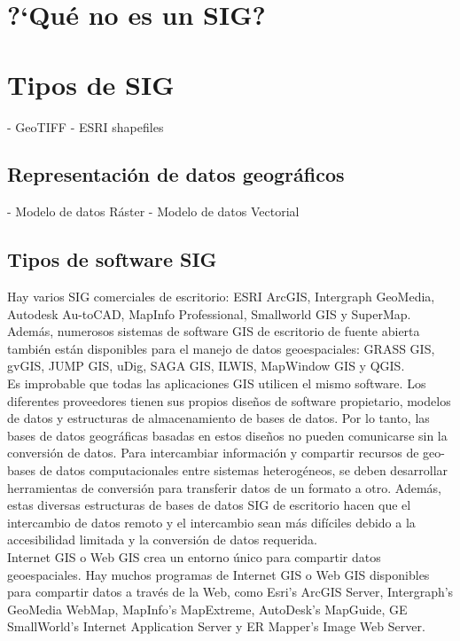\section{?`Qué no es un SIG?}




\section{Tipos de SIG}


- GeoTIFF
- ESRI shapefiles

\subsection{Representación de datos geográficos}

- Modelo de datos Ráster
- Modelo de datos Vectorial

\subsection{Tipos de software SIG}


Hay varios SIG comerciales de escritorio: ESRI ArcGIS, Intergraph GeoMedia, Autodesk Au-toCAD, MapInfo Professional, Smallworld GIS y SuperMap.\\

Además, numerosos sistemas de software GIS de escritorio de fuente abierta también están disponibles para el manejo de datos geoespaciales: GRASS GIS, gvGIS, JUMP GIS, uDig, SAGA GIS, ILWIS, MapWindow GIS y QGIS.\\

Es improbable que todas las aplicaciones GIS utilicen el mismo software. Los diferentes proveedores tienen sus propios diseños de software propietario, modelos de datos y estructuras de almacenamiento de bases de datos. Por lo tanto, las bases de datos geográficas basadas en estos diseños no pueden comunicarse sin la conversión de datos. Para intercambiar información y compartir recursos de geo-bases de datos computacionales entre sistemas heterogéneos, se deben desarrollar herramientas de conversión para transferir datos de un formato a otro. Además, estas diversas estructuras de bases de datos SIG de escritorio hacen que el intercambio de datos remoto y el intercambio sean más difíciles debido a la accesibilidad limitada y la conversión de datos requerida.\\

Internet GIS o Web GIS crea un entorno único para compartir datos geoespaciales. Hay muchos programas de Internet GIS o Web GIS disponibles para compartir datos a través de la Web, como Esri’s ArcGIS Server, Intergraph’s GeoMedia WebMap, MapInfo’s MapExtreme, AutoDesk’s MapGuide, GE SmallWorld’s Internet Application Server y ER Mapper’s Image Web Server.\\

